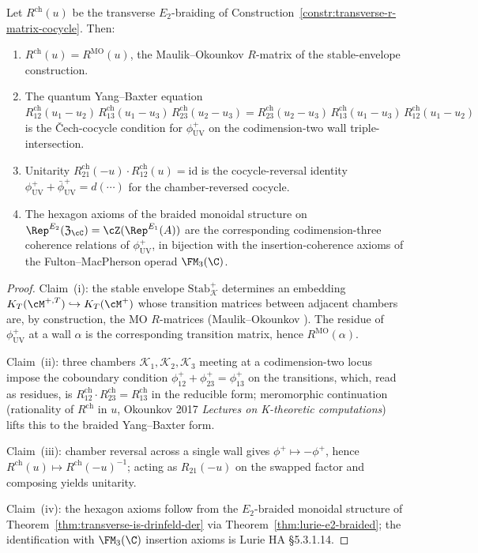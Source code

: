 \begin{theorem}
\label{thm:mo-equals-cocycle}
Let $R^{\mathrm{ch}}(u)$ be the transverse $E_2$-braiding of
Construction~\ref{constr:transverse-r-matrix-cocycle}. Then:
\begin{enumerate}[label=\textup{(\roman*)}]
 \item $R^{\mathrm{ch}}(u) = R^{\mathrm{MO}}(u)$, the Maulik--Okounkov
 $R$-matrix of the stable-envelope construction.
 \item The quantum Yang--Baxter equation
 $R^{\mathrm{ch}}_{12}(u_1 - u_2) \, R^{\mathrm{ch}}_{13}(u_1 - u_3) \,
 R^{\mathrm{ch}}_{23}(u_2 - u_3) =
 R^{\mathrm{ch}}_{23}(u_2 - u_3) \, R^{\mathrm{ch}}_{13}(u_1 - u_3) \,
 R^{\mathrm{ch}}_{12}(u_1 - u_2)$
 is the \v{C}ech-cocycle condition for $\phi^+_{\mathrm{UV}}$ on the
 codimension-two wall triple-intersection.
 \item Unitarity $R^{\mathrm{ch}}_{21}(-u) \cdot R^{\mathrm{ch}}_{12}(u)
 = \mathrm{id}$ is the cocycle-reversal identity
 $\phi^+_{\mathrm{UV}} + \bar\phi^+_{\mathrm{UV}} = d(\cdots)$ for the
 chamber-reversed cocycle.
 \item The hexagon axioms of the braided monoidal structure on
 $\Rep^{E_2}(\fZ_\cC) = \cZ(\Rep^{E_1}(A))$ are the corresponding
 codimension-three coherence relations of $\phi^+_{\mathrm{UV}}$, in
 bijection with the insertion-coherence axioms of the
 Fulton--MacPherson operad $\FM_3(\C)$.
\end{enumerate}
\end{theorem}

\begin{proof}
Claim~(i): the stable envelope $\mathrm{Stab}_{\mathcal{K}}^+$
determines an embedding $K_T(\cM^{+, T}) \hookrightarrow K_T(\cM^+)$
whose transition matrices between adjacent chambers are, by
construction, the MO $R$-matrices (Maulik--Okounkov
\cite[Thm.~4.6.1]{MaulikOkounkov2012}). The residue of
$\phi^+_{\mathrm{UV}}$ at a wall $\alpha$ is the corresponding
transition matrix, hence $R^{\mathrm{MO}}(\alpha)$.

Claim~(ii): three chambers $\mathcal{K}_1, \mathcal{K}_2, \mathcal{K}_3$
meeting at a codimension-two locus impose the coboundary condition
$\phi^+_{12} + \phi^+_{23} = \phi^+_{13}$ on the transitions, which,
read as residues, is
$R^{\mathrm{ch}}_{12} \cdot R^{\mathrm{ch}}_{23} = R^{\mathrm{ch}}_{13}$
in the reducible form; meromorphic continuation (rationality of
$R^{\mathrm{ch}}$ in $u$, Okounkov 2017 \emph{Lectures on K-theoretic
computations})
lifts this to the braided Yang--Baxter form.

Claim~(iii): chamber reversal across a single wall gives
$\phi^+ \mapsto -\phi^+$, hence $R^{\mathrm{ch}}(u) \mapsto
R^{\mathrm{ch}}(-u)^{-1}$; acting as $R_{21}(-u)$ on the swapped
factor and composing yields unitarity.

Claim~(iv): the hexagon axioms follow from the $E_2$-braided monoidal
structure of Theorem~\ref{thm:transverse-is-drinfeld-der} via
Theorem~\ref{thm:lurie-e2-braided}; the identification with
$\FM_3(\C)$ insertion axioms is Lurie HA \S 5.3.1.14.
\end{proof}

